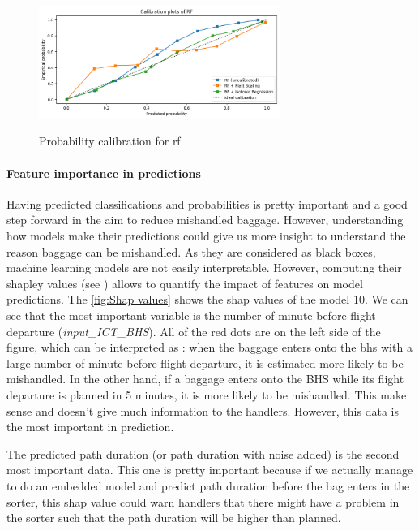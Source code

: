\documentclass[12pt]{article}
\begin{document}
\FloatBarrier
\begin{figure}[h]
    \centering
    \includegraphics[width=0.7\textwidth]{Calibration_plot_RF.png}\\
    \caption{Probability calibration for \acrfull{rf}}
    \label{fig:Probability calibration for rf}
\end{figure}
\FloatBarrier


\paragraph{Feature importance in predictions}
Having predicted classifications and probabilities is pretty important and a good step forward in the aim to reduce mishandled baggage. However, understanding how models make their predictions could give us more insight to understand the reason baggage can be mishandled. As they are considered as black boxes, machine learning models are not easily interpretable. However, computing their shapley values (see \cite{Shapvalues}) allows to quantify the impact of features on model predictions. The \autoref{fig:Shap values} shows the shap values of the model 10. We can see that the most important variable is the number of minute before flight departure (\textit{input\_ICT\_BHS}). All of the red dots are on the left side of the figure, which can be interpreted as : when the baggage enters onto the \acrshort{bhs} with a large number of minute before flight departure, it is estimated more likely to be mishandled. In the other hand, if a baggage enters onto the BHS while its flight departure is planned in 5 minutes, it is more likely to be mishandled. This make sense and doesn't give much information to the handlers. However, this data is the most important in prediction. \hfill \break

The predicted path duration (or path duration with noise added) is the second most important data. This one is pretty important because if we actually manage to do an embedded model and predict path duration before the bag enters in the sorter, this shap value could warn handlers that there might have a problem in the sorter such that the path duration will be higher than planned.
\end{document}
